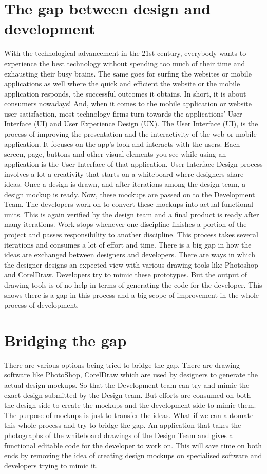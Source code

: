 \section{The gap between design and development}
With the technological advancement in the 21st-century, everybody wants to experience the best technology without spending too much of their time and exhausting their busy brains. The same goes for surfing the websites or mobile applications as well where the quick and efficient the website or the mobile application responds, the successful outcomes it obtains. In short, it is about consumers nowadays! And, when it comes to the mobile application or website user satisfaction, most technology firms turn towards the applications’ User Interface (UI) and User Experience Design (UX).
The User Interface (UI), is the process of improving the presentation and the interactivity of the web or mobile application. It focuses on the app’s look and interacts with the users. Each screen, page, buttons and other visual elements you see while using an application is the User Interface of that application.
User Interface Design process involves a lot a creativity that starts on a whiteboard where designers share ideas. Once a design is drawn, and after iterations among the design team, a design mockup is ready. Now, these mockups are passed on to the Development Team. The developers work on to convert these mockups into actual functional units. This is again verified by the design team and a final product is ready after many iterations.
Work stops whenever one discipline finishes a portion of the project and passes responsibility to another discipline. This process takes several iterations and consumes a lot of effort and time. There is a big gap in how the ideas are exchanged between designers and developers. There are ways in which the designer designs an expected view with various drawing tools like Photoshop and CorelDraw. Developers try to mimic these prototypes. But the output of drawing tools is of no help in terms of generating the code for the developer. This shows there is a gap in this process and a big scope of improvement in the whole process of development.

\section{Bridging the gap}
There are various options being tried to bridge the gap. There are drawing software like PhotoShop, CorelDraw which are used by designers to generate the actual design mockups. So that the Development team can try and mimic the exact design submitted by the Design team. But efforts are consumed on both the design side to create the mockups and the development side to mimic them. The purpose of mockups is just to transfer the ideas.
What if we can automate this whole process and try to bridge the gap. An application that takes the photographs of the whiteboard drawings of the Design Team and gives a functional editable code for the developer to work on. This will save time on both ends by removing the idea of creating design mockups on specialised software and developers trying to mimic it.

